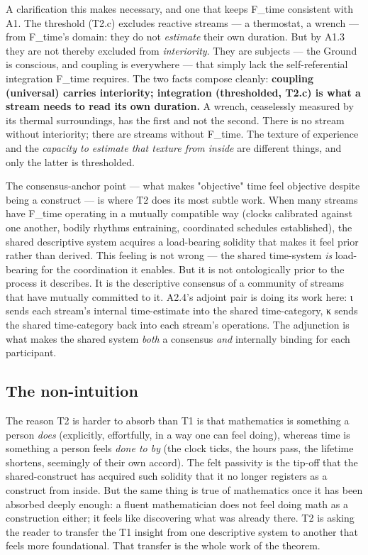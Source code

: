 \documentclass[11pt, openany]{book}
\begin{document}
A clarification this makes necessary, and one that keeps F\_\allowbreak{}time consistent with A1. The threshold (T2.c) excludes reactive streams --- a thermostat, a wrench --- from F\_\allowbreak{}time's domain: they do not \textit{estimate} their own duration. But by A1.3 they are not thereby excluded from \textit{interiority}. They are subjects --- the Ground is conscious, and coupling is everywhere --- that simply lack the self-referential integration F\_\allowbreak{}time requires. The two facts compose cleanly: \textbf{coupling (universal) carries interiority; integration (thresholded, T2.c) is what a stream needs to read its own duration.} A wrench, ceaselessly measured by its thermal surroundings, has the first and not the second. There is no stream without interiority; there are streams without F\_\allowbreak{}time. The texture of experience and the \textit{capacity to estimate that texture from inside} are different things, and only the latter is thresholded.

The consensus-anchor point --- what makes "objective" time feel objective despite being a construct --- is where T2 does its most subtle work. When many streams have F\_\allowbreak{}time operating in a mutually compatible way (clocks calibrated against one another, bodily rhythms entraining, coordinated schedules established), the shared descriptive system acquires a load-bearing solidity that makes it feel prior rather than derived. This feeling is not wrong --- the shared time-system \textit{is} load-bearing for the coordination it enables. But it is not ontologically prior to the process it describes. It is the descriptive consensus of a community of streams that have mutually committed to it. A2.4's adjoint pair is doing its work here: ι sends each stream's internal time-estimate into the shared time-category, κ sends the shared time-category back into each stream's operations. The adjunction is what makes the shared system \textit{both} a consensus \textit{and} internally binding for each participant.

\subsection{The non-intuition}

The reason T2 is harder to absorb than T1 is that mathematics is something a person \textit{does} (explicitly, effortfully, in a way one can feel doing), whereas time is something a person feels \textit{done to by} (the clock ticks, the hours pass, the lifetime shortens, seemingly of their own accord). The felt passivity is the tip-off that the shared-construct has acquired such solidity that it no longer registers as a construct from inside. But the same thing is true of mathematics once it has been absorbed deeply enough: a fluent mathematician does not feel doing math as a construction either; it feels like discovering what was already there. T2 is asking the reader to transfer the T1 insight from one descriptive system to another that feels more foundational. That transfer is the whole work of the theorem.
\end{document}
